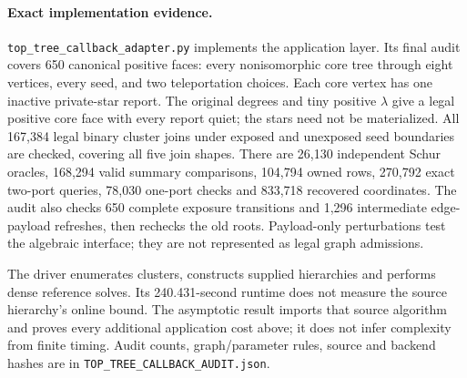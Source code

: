 \paragraph{Exact implementation evidence.}
\texttt{top\_tree\_callback\_adapter.py} implements the application layer.
Its final audit covers 650 canonical positive faces: every nonisomorphic
core tree through eight vertices, every seed, and two teleportation choices.
Each core vertex has one inactive private-star report. The original degrees
and tiny positive $\lambda$ give a legal positive core face with every report
quiet; the stars need not be materialized. All 167,384 legal binary cluster
joins under exposed and unexposed seed boundaries are checked, covering all
five join shapes. There are 26,130 independent Schur oracles, 168,294 valid
summary comparisons, 104,794 owned rows, 270,792 exact two-port queries,
78,030 one-port checks and 833,718 recovered coordinates. The audit also
checks 650 complete exposure transitions and 1,296 intermediate edge-payload
refreshes, then rechecks the old roots. Payload-only perturbations test the
algebraic interface; they are not represented as legal graph admissions.

The driver enumerates clusters, constructs supplied hierarchies and performs
dense reference solves. Its 240.431-second runtime does not measure the
source hierarchy's online bound. The asymptotic result imports that source
algorithm and proves every additional application cost above; it does not
infer complexity from finite timing. Audit counts, graph/parameter rules,
source and backend hashes are in \texttt{TOP\_TREE\_CALLBACK\_AUDIT.json}.
